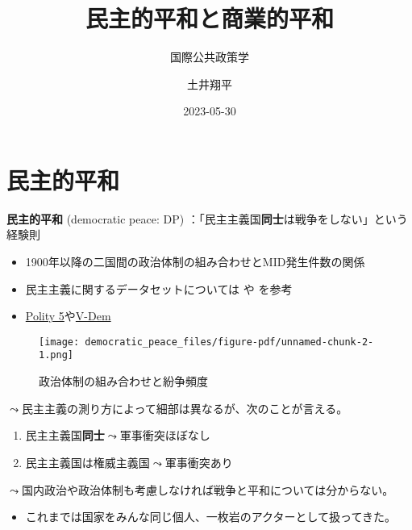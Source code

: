 \documentclass[
  xelatex,
  ja=standard]{bxjsarticle}
\title{民主的平和と商業的平和}
\subtitle{国際公共政策学}
\author{土井翔平}
\date{2023-05-30}
\providecommand{\tightlist}{%
  \setlength{\itemsep}{0pt}\setlength{\parskip}{0pt}}\usepackage{longtable,booktabs,array}
\begin{document}
\maketitle
\ifdefined\Shaded\renewenvironment{Shaded}{\begin{tcolorbox}[interior hidden, frame hidden, sharp corners, borderline west={3pt}{0pt}{shadecolor}, boxrule=0pt, breakable, enhanced]}{\end{tcolorbox}}\fi

\hypertarget{ux6c11ux4e3bux7684ux5e73ux548c}{%
\section{民主的平和}\label{ux6c11ux4e3bux7684ux5e73ux548c}}

\textbf{民主的平和} (democratic peace: DP)
：「民主主義国\textbf{同士}は戦争をしない」という経験則

\begin{itemize}
\tightlist
\item
  1900年以降の二国間の政治体制の組み合わせとMID発生件数の関係
\item
  民主主義に関するデータセットについては \citet{kubo2016} や
  \citet{kasuya2014} を参考
\item
  \href{https://www.systemicpeace.org/polityproject.html}{Polity
  5}や\href{https://www.v-dem.net/}{V-Dem}
\end{itemize}

\begin{figure}[htpb]

{\centering \texttt{[image: democratic\_peace\_files/figure-pdf/unnamed-chunk-2-1.png]}

}

\caption{政治体制の組み合わせと紛争頻度}

\end{figure}

\(\leadsto\)民主主義の測り方によって細部は異なるが、次のことが言える\citep{gleditsch1997}。

\begin{enumerate}
\def\labelenumi{\arabic{enumi}.}
\tightlist
\item
  民主主義国\textbf{同士}\(\leadsto\)軍事衝突ほぼなし
\item
  民主主義国は権威主義国\(\leadsto\)軍事衝突あり
\end{enumerate}

\(\leadsto\)国内政治や政治体制も考慮しなければ戦争と平和については分からない。

\begin{itemize}
\tightlist
\item
  これまでは国家をみんな同じ個人、一枚岩のアクターとして扱ってきた。
\end{itemize}
\end{document}
